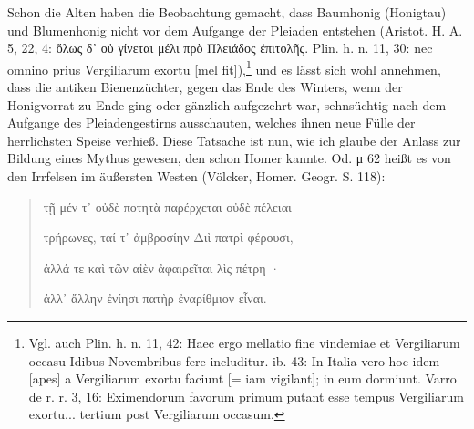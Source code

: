 \documentclass[a4paper, 11pt, oneside]{article}
\begin{document}
Schon die Alten haben die Beobachtung gemacht, dass Baumhonig (Honigtau) und Blumenhonig nicht vor dem Aufgange der Pleiaden entstehen (Aristot. H. A. 5, 22, 4: ὅλως δ᾽ οὐ γίνεται μέλι πρὸ Πλειάδος ἐπιτολῆς. Plin. h. n. 11, 30: nec omnino prius Vergiliarum exortu [mel fit]),\footnote{Vgl. auch Plin. h. n. 11, 42: Haec ergo mellatio fine vindemiae et Vergiliarum occasu Idibus Novembribus fere includitur. ib. 43: In Italia vero hoc idem [apes] a Vergiliarum exortu faciunt [= iam vigilant]; in eum dormiunt. Varro de r. r. 3, 16: Eximendorum favorum primum putant esse tempus Vergiliarum exortu... tertium post Vergiliarum occasum.} und es lässt sich wohl annehmen, dass die antiken Bienenzüchter, gegen das Ende des Winters, wenn der Honigvorrat zu Ende ging oder gänzlich aufgezehrt war, sehnsüchtig nach dem Aufgange des Pleiadengestirns ausschauten, welches ihnen neue Fülle der herrlichsten Speise verhieß. Diese Tatsache ist nun, wie ich glaube der Anlass zur Bildung eines Mythus gewesen, den schon Homer kannte. Od. μ 62 heißt es von den Irrfelsen im äußersten Westen (Völcker, Homer. Geogr. S. 118):
\begin{quotation}
τῇ μέν τ᾽ οὐδὲ ποτητὰ παρέρχεται οὐδὲ πέλειαι

τρήρωνες, ταί τ᾽ ἀμβροσίην Διὶ πατρὶ φέρουσι,

ἀλλά τε καὶ τῶν αἰὲν ἀφαιρεῖται λὶς πέτρη ·

ἀλλ᾽ ἄλλην ἐνίησι πατὴρ ἐναρίθμιον εἶναι.
\end{quotation}
\end{document}
